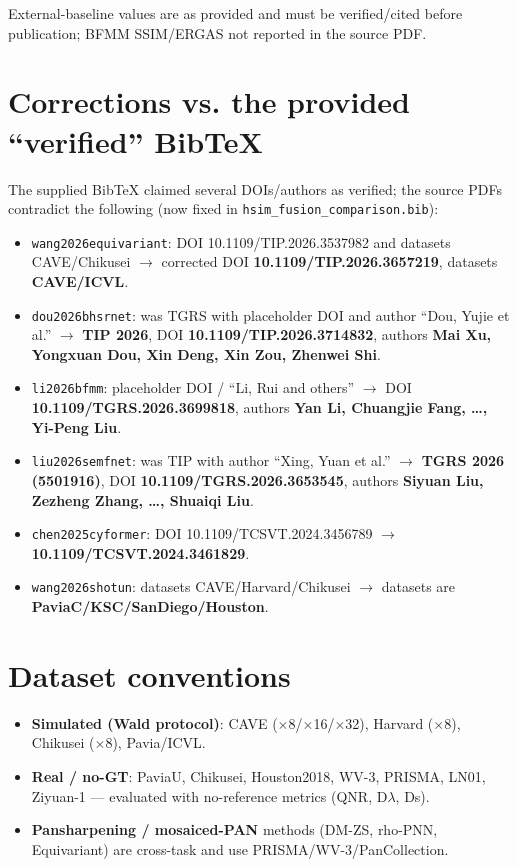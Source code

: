 \documentclass[11pt]{article}
\begin{document}
\normalsize
\noindent External-baseline values are as provided and must be verified/cited before
publication; BFMM SSIM/ERGAS not reported in the source PDF.

\section{Corrections vs. the provided ``verified'' BibTeX}
The supplied BibTeX claimed several DOIs/authors as verified; the source PDFs
contradict the following (now fixed in \texttt{hsim\_fusion\_comparison.bib}):
\begin{itemize}
  \item \texttt{wang2026equivariant}: DOI 10.1109/TIP.2026.3537982 and
        datasets CAVE/Chikusei $\to$ corrected DOI
        \textbf{10.1109/TIP.2026.3657219}, datasets \textbf{CAVE/ICVL}.
  \item \texttt{dou2026bhsrnet}: was TGRS with placeholder DOI and author
        ``Dou, Yujie et al.'' $\to$ \textbf{TIP 2026}, DOI
        \textbf{10.1109/TIP.2026.3714832}, authors \textbf{Mai Xu, Yongxuan
        Dou, Xin Deng, Xin Zou, Zhenwei Shi}.
  \item \texttt{li2026bfmm}: placeholder DOI / ``Li, Rui and others'' $\to$
        DOI \textbf{10.1109/TGRS.2026.3699818}, authors \textbf{Yan Li,
        Chuangjie Fang, \dots, Yi-Peng Liu}.
  \item \texttt{liu2026semfnet}: was TIP with author ``Xing, Yuan et al.''
        $\to$ \textbf{TGRS 2026 (5501916)}, DOI
        \textbf{10.1109/TGRS.2026.3653545}, authors \textbf{Siyuan Liu,
        Zezheng Zhang, \dots, Shuaiqi Liu}.
  \item \texttt{chen2025cyformer}: DOI 10.1109/TCSVT.2024.3456789 $\to$
        \textbf{10.1109/TCSVT.2024.3461829}.
  \item \texttt{wang2026shotun}: datasets CAVE/Harvard/Chikusei $\to$
        datasets are \textbf{PaviaC/KSC/SanDiego/Houston}.
\end{itemize}

\section*{Dataset conventions}
\begin{itemize}
  \item \textbf{Simulated (Wald protocol)}: CAVE ($\times$8/$\times$16/$\times$32),
        Harvard ($\times$8), Chikusei ($\times$8), Pavia/ICVL.
  \item \textbf{Real / no-GT}: PaviaU, Chikusei, Houston2018, WV-3, PRISMA,
        LN01, Ziyuan-1 — evaluated with no-reference metrics (QNR, D$\lambda$, Ds).
  \item \textbf{Pansharpening / mosaiced-PAN} methods (DM-ZS, rho-PNN,
        Equivariant) are cross-task and use PRISMA/WV-3/PanCollection.
\end{itemize}



\end{document}
